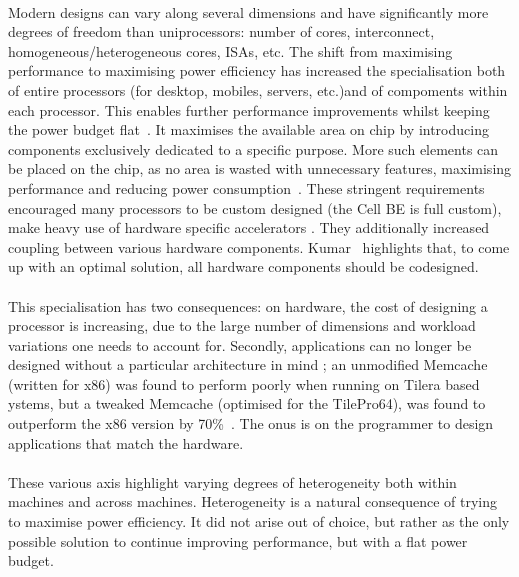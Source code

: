 \paragraph{} Modern designs can vary along several dimensions and have significantly
more degrees of freedom than uniprocessors: number of cores, interconnect, 
homogeneous/heterogeneous cores, ISAs, etc. The shift from maximising 
performance to maximising power efficiency has increased
the specialisation both of entire processors (for desktop, mobiles,
servers, etc.)and of compoments within each processor. This enables further
performance improvements whilst keeping the power budget flat~\cite{borkar2011future}. It maximises the available area on chip by introducing
components exclusively dedicated to a specific purpose. More
such elements can be placed on the chip, as no area is wasted
with unnecessary features, maximising performance and reducing
power consumption~\cite{borkar2011future}.  
These stringent requirements encouraged many processors to be custom designed
(the Cell BE is full custom), make heavy use of hardware specific accelerators \cite{kahle2005cell}. They additionally increased coupling between various hardware components.
Kumar~\cite{1431574} highlights that, to come up with an optimal solution, all hardware components should be codesigned.  

\paragraph{} This specialisation has two consequences: 
on hardware, the cost of designing a processor is increasing, due 
to the large number of dimensions and workload variations one needs to account for. 
Secondly, applications can no longer be designed without a particular architecture in mind ; an unmodified Memcache (written for x86) was found to perform poorly when  running on Tilera based ystems, but a tweaked Memcache (optimised for the TilePro64),  was found to outperform the x86 version by 70\%~\cite{berezecki2011manycore}. The onus is on the programmer to design applications that match the hardware.



\paragraph{}  These various axis highlight varying degrees of heterogeneity both within
machines and across machines. Heterogeneity is a natural consequence of 
trying to maximise power efficiency. It did not arise out of choice,  but rather as
the only possible solution to continue improving performance, but with 
a flat power budget. 

